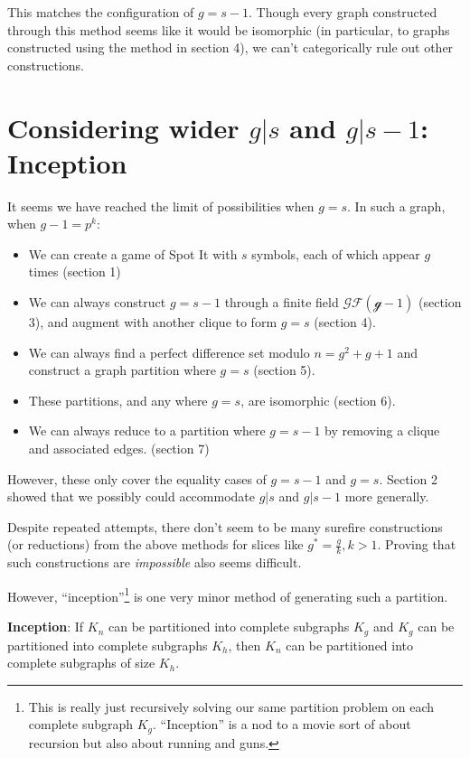 \documentclass[11pt, oneside]{article} 	%
\begin{document}
This matches the configuration of $g=s-1$. Though every graph constructed through this method seems like it would be isomorphic (in particular, to graphs constructed using the method in section 4), we can't categorically rule out other constructions. 

\section{Considering wider $g | s$ and $g | s-1$: Inception}

It seems we have reached the limit of possibilities when $g=s$. In such a graph, when $g-1 = p^k$:
\begin{itemize}
\item We can create a game of Spot It with $s$ symbols, each of which appear $g$ times (section 1)
\item We can always construct $g=s-1$ through a finite field $\mathcal{GF(g-1)}$ (section 3), and augment with another clique to form $g=s$ (section 4).
\item We can always find a perfect difference set modulo $n = g^2+g+1$ and construct a graph partition where $g=s$ (section 5).
\item These partitions, and any where $g=s$, are isomorphic (section 6).
\item We can always reduce to a partition where $g=s-1$ by removing a clique and associated edges. (section 7)
\end{itemize}

However, these only cover the equality cases of $g=s-1$ and $g=s$. Section 2 showed that we possibly could accommodate $g | s$ and $g | s-1$ more generally.

Despite repeated attempts, there don't seem to be many surefire constructions (or reductions) from the above methods for slices like $g^* = \frac{g}{k}, k > 1$. Proving that such constructions are \emph{impossible} also seems difficult.

However, ``inception''\footnote{This is really just recursively solving our same partition problem on each complete subgraph $K_g$. ``Inception'' is a nod to a movie sort of about recursion but also about running and guns.} is one very minor method of generating such a partition. 

\begin{framed}
\textbf{Inception}: If $K_n$ can be partitioned into complete subgraphs $K_g$ and $K_g$ can be partitioned into complete subgraphs $K_h$, then $K_n$ can be partitioned into complete subgraphs of size $K_h$. 
\end{framed}
\end{document}
